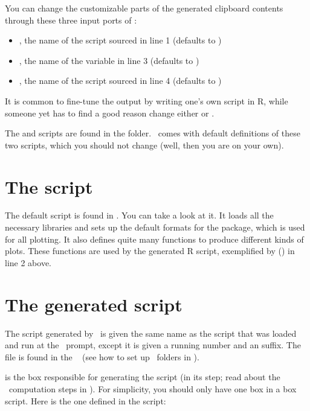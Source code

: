 You can change the customizable parts of the generated clipboard contents through these three input ports of :
\begin{itemize}
\item {}, the name of the script sourced in line 1 (defaults to )
\item {}, the name of the variable in line 3 (defaults to )
\item {}, the name of the script sourced in line 4 (defaults to )
\end{itemize}

It is common to fine-tune the output by writing one's own  script in R, while someone yet has to find a good reason change either  or .

The  and  scripts are found in the  folder. \US\ comes with default definitions of these two scripts, which you should not change (well, then you are on your own). 

\section{The  script}

The default  script is found in . You can take a look at it. It loads all the necessary libraries and sets up the default formats for the  package, which is used for all plotting. It also defines quite many functions to produce different kinds of plots. These functions are used by the generated R script, exemplified by () in line 2 above.



\section{The generated script}
The script generated by \US\ is given the same name as the script that was loaded and run at the \US\ prompt, except it is given a running number and an  suffix. The file is found in the \US\  (see how to set up \US\ folders in ). 

 is the box responsible for generating the script (in its  step; read about the \US\ computation steps in ). For simplicity, you should only have one  box in a box script. Here is the one defined in the  script:

